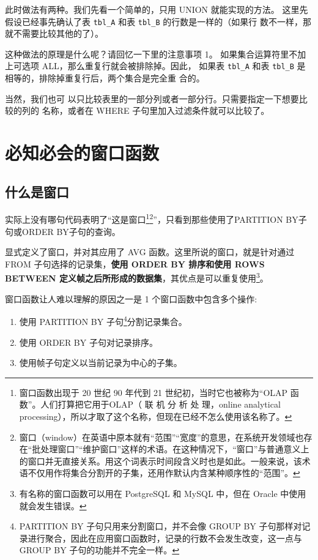 此时做法有两种。我们先看一个简单的，只用 UNION 就能实现的方法。
这里先假设已经事先确认了表 \verb|tbl_A| 和表 \verb|tbl_B| 的行数是一样的（如果行
数不一样，那就不需要比较其他的了）。

这种做法的原理是什么呢？请回忆一下里的注意事项 1。
如果集合运算符里不加上可选项 ALL，那么重复行就会被排除掉。因此，
如果表 \verb|tbl_A| 和表 \verb|tbl_B| 是相等的，排除掉重复行后，两个集合是完全重
合的。

当然，我们也可
以只比较表里的一部分列或者一部分行。只需要指定一下想要比较的列的
名称，或者在 WHERE 子句里加入过滤条件就可以比较了。

\section{必知必会的窗口函数}
\subsection{什么是窗口}
实际上没有哪句代码表明了“这是窗口\footnote{窗口函数出现于 20 世纪 90 年代到 21 世纪初，当时它也被称为“OLAP 函数”。人们打算把它用于OLAP（ 联 机 分 析 处 理，online analytical processing），所以才取了这个名称，但现在已经不怎么使用该名称了。}\footnote{窗口（window）在英语中原本就有“范围”“宽度”的意思，在系统开发领域也存在“批处理窗口”“维护窗口”这样的术语。在这种情况下，“窗口”与普通意义上的窗口并无直接关系。用这个词表示时间段含义时也是如此。一般来说，该术语不仅用作将集合分割开的子集，还用作默认内含某种顺序性的“范围”。}”，只看到那些使用了\textsf{PARTITION BY}子句或\textsf{ORDER BY}子句的查询。

显式定义了窗口，并对其应用了 AVG 函数。这里所说的窗口，就是针对通过 FROM 子句选择的记录集，\textbf{使用 ORDER BY 排序和使用 ROWS BETWEEN 定义帧之后所形成的数据集}，其优点是可以重复使用\footnote{有名称的窗口函数可以用在 PostgreSQL 和 MySQL 中，但在 Oracle 中使用就会发生错误。}。

窗口函数让人难以理解的原因之一是 1 个窗口函数中包含多个操作:
\begin{enumerate}
      \item 使用 PARTITION BY 子句\footnote{PARTITION BY 子句只用来分割窗口，并不会像 GROUP BY 子句那样对记录进行聚合，因此在应用窗口函数时，记录的行数不会发生改变，这一点与 GROUP BY 子句的功能并不完全一样。}分割记录集合。
      \item 使用 ORDER BY 子句对记录排序。
      \item 使用帧子句定义以当前记录为中心的子集。
\end{enumerate}

